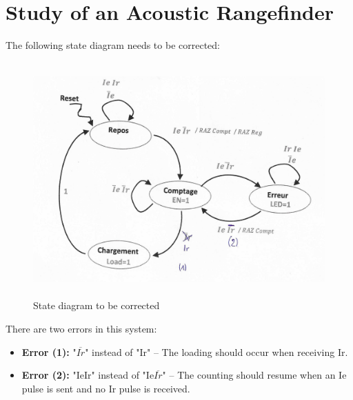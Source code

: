 \section{Study of an Acoustic Rangefinder}
The following state diagram needs to be corrected:

\begin{figure}[H]
\centering
\includegraphics[height=9cm]{img/graph2.jpg}
\caption{State diagram to be corrected}
\end{figure}

There are two errors in this system:
\begin{itemize}
    \item \textbf{Error (1):} "$\overline{Ir}$" instead of "Ir" – The loading should occur when receiving Ir.
    \item \textbf{Error (2):} "IeIr" instead of "Ie$\overline{Ir}$" – The counting should resume when an Ie pulse is sent and no Ir pulse is received.
\end{itemize}
